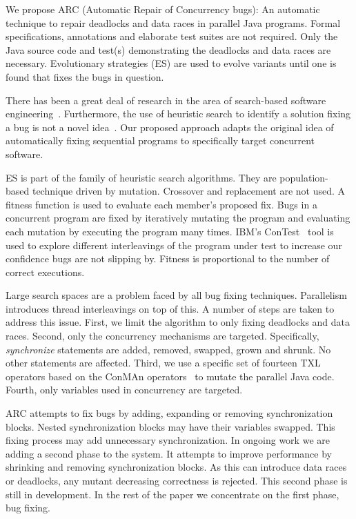 \documentclass{llncs}
\begin{document}
We propose ARC (Automatic Repair of Concurrency bugs): An automatic technique
to repair deadlocks and data races in parallel Java programs. Formal
specifications, annotations and elaborate test suites are not required. Only
the Java source code and test(s) demonstrating the deadlocks and data races are
necessary. Evolutionary strategies (ES) are used to evolve variants until one
is found that fixes the bugs in question.

There has been a great deal of research in the area of search-based software
engineering~\cite{Har+10}. Furthermore, the use of heuristic search to identify
a solution fixing a bug is not a novel idea~\cite{FNWG09, AY08, Arc08, WT10,
WNLF09, WFGN10}. Our proposed approach adapts the original idea of
automatically fixing sequential programs to specifically target concurrent
software.

ES is part of the family of heuristic search algorithms. They are population-
based technique driven by mutation. Crossover and replacement are not used.
A fitness function is used to evaluate each member's proposed fix. Bugs in a
concurrent program are fixed by iteratively mutating the program and evaluating
each mutation by executing the program many times. IBM's ConTest~\cite{EFN+02}
tool is used to explore different interleavings of the program under test to
increase our confidence bugs are not slipping by. Fitness is proportional to the
number of correct executions.

Large search spaces are a problem faced by all bug fixing techniques.
Parallelism introduces thread interleavings on top of this. A number of steps
are taken to address this issue. First, we limit the algorithm to only fixing
deadlocks and data races. Second, only the concurrency mechanisms are targeted.
Specifically, \textit{synchronize} statements are added, removed, swapped,
grown and shrunk. No other statements are affected. Third, we use a specific
set of fourteen TXL~\cite{CHP91} operators based on the ConMAn
operators~\cite{BCD06} to mutate the parallel Java code.  Fourth, only variables
used in concurrency are targeted.

ARC attempts to fix bugs by adding, expanding or removing synchronization
blocks.  Nested synchronization blocks may have their variables swapped.
This fixing process may add unnecessary
synchronization. In ongoing work we are adding a second phase to the system.  It
attempts to improve performance by shrinking and removing synchronization
blocks. As this can introduce data races or deadlocks, any mutant decreasing
correctness is rejected. This second phase is still in development.  In the rest of
the paper we concentrate on the first phase, bug fixing.
\end{document}
